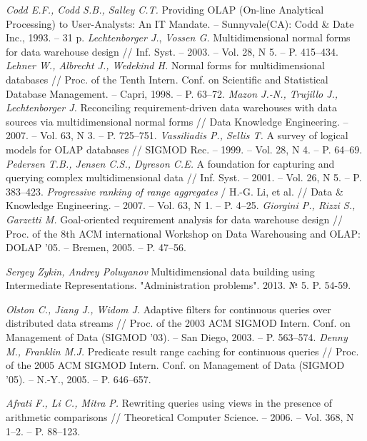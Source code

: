 \begin{thebibliography}{9}
  \textit{Codd E.F., Codd S.B., Salley C.T.}
  Providing OLAP (On-line Analytical Processing) to User-Analysts: An IT
  Mandate. – Sunnyvale(CA): Codd \& Date Inc.,
  1993.
  – 31 p.
  \textit{Lechtenborger J.}, \textit{Vossen G.}
  Multidimensional normal forms for data warehouse design
  // Inf. Syst.
  – 2003.
  – Vol. 28, N 5. – P. 415–434. 
  \textit{Lehner W., Albrecht J., Wedekind H.}
  Normal forms for multidimensional databases
  // Proc. of the Tenth Intern. Conf. on Scientific and Statistical Database
  Management.
  – Capri, 1998.
  – P. 63–72.
  \textit{Mazon J.-N., Trujillo J., Lechtenborger J.}
  Reconciling requirement-driven data warehouses with data sources via
  multidimensional normal forms
  // Data Knowledge Engineering.
  – 2007.
  – Vol. 63, N 3. – P. 725–751.
  \textit{Vassiliadis P., Sellis T.}
  A survey of logical models for OLAP databases
  // SIGMOD Rec.
  – 1999.
  – Vol. 28, N 4. – P. 64–69.
  \textit{Pedersen T.B., Jensen C.S., Dyreson C.E.}
  A foundation for capturing and querying complex multidimensional data
  // Inf. Syst.
  – 2001.
  – Vol. 26, N 5. – P. 383–423.
  \textit{Progressive ranking of range aggregates}
  / H.-G. Li, et al.
  // Data \& Knowledge Engineering.
  – 2007.
  – Vol. 63, N 1. – P. 4–25. 
  \textit{Giorgini P., Rizzi S., Garzetti M.}
  Goal-oriented requirement analysis for data warehouse design
  // Proc. of the 8th ACM international Workshop on Data Warehousing and OLAP: DOLAP '05.
  – Bremen, 2005.
  – P. 47–56.

  \textit{Sergey Zykin, Andrey Poluyanov}
  Multidimensional data building using Intermediate Representations.
  "Administration problems".
  2013.
  № 5. P. 54-59.

  \textit{Olston C., Jiang J., Widom J.}
  Adaptive filters for continuous queries over distributed data streams
  // Proc. of the 2003 ACM SIGMOD Intern. Conf. on Management of Data (SIGMOD '03).
  – San Diego, 2003.
  – P. 563–574.
  \textit{Denny M., Franklin M.J.}
  Predicate result range caching for continuous queries
  // Proc. of the 2005 ACM SIGMOD Intern. Conf. on Management of Data (SIGMOD '05).
  – N.-Y., 2005.
  – P. 646–657.

  \textit{Afrati F., Li C., Mitra P.}
  Rewriting queries using views in the presence of arithmetic comparisons
  // Theoretical Computer Science.
  – 2006.
 – Vol. 368, N 1–2. – P. 88–123.


\end{thebibliography}
